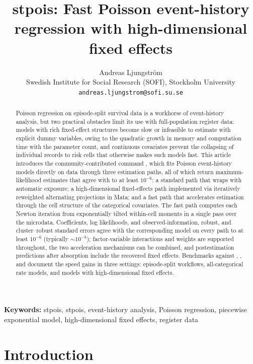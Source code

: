 \documentclass[12pt,a4paper]{article}
\title{stpois: Fast Poisson event-history regression with
high-dimensional fixed effects}
\author{%
  Andreas Ljungström\\
  \small Swedish Institute for Social Research (SOFI), Stockholm University\\
  \small\texttt{andreas.ljungstrom@sofi.su.se}%
}
\date{}
\def\inserttag{stpois}
\begin{document}
\maketitle

\begin{abstract}
\noindent Poisson regression on episode-split survival data is a
workhorse of event-history analysis, but two practical obstacles limit
its use with full-population register data: models with rich
fixed-effect structures become slow or infeasible to estimate with
explicit dummy variables, owing to the quadratic growth in memory and
computation time with the parameter count, and continuous covariates
prevent the collapsing of individual records to risk cells that
otherwise makes such models fast. This article introduces the
community-contributed command , which fits Poisson
event-history models directly on  data through three
estimation paths, all of which return maximum-likelihood estimates that
agree with  to at least \(10^{-6}\): a standard path that
wraps  with automatic exposure; a high-dimensional
fixed-effects path implemented via iteratively reweighted alternating
projections in Mata; and a fast path that accelerates estimation through
the cell structure of the categorical covariates. The fast path computes
each Newton iteration from exponentially tilted within-cell moments in a
single pass over the microdata. Coefficients, log likelihoods, and
observed-information, robust, and cluster--robust standard errors agree
with the corresponding  model on every path to at least
\(10^{-6}\) (typically \(\sim 10^{-8}\)); factor-variable interactions
and weights are supported throughout, the two acceleration mechanisms
can be combined, and postestimation predictions after absorption include
the recovered fixed effects. Benchmarks against ,
, and  document the speed gains in three
settings: episode-split workflows, all-categorical rate models, and
models with high-dimensional fixed effects.
\end{abstract}

\medskip\noindent\textbf{Keywords:} \inserttag, stpois, event-history
analysis, Poisson regression, piecewise exponential model,
high-dimensional fixed effects, register data

\bigskip

\section{Introduction}
\end{document}
